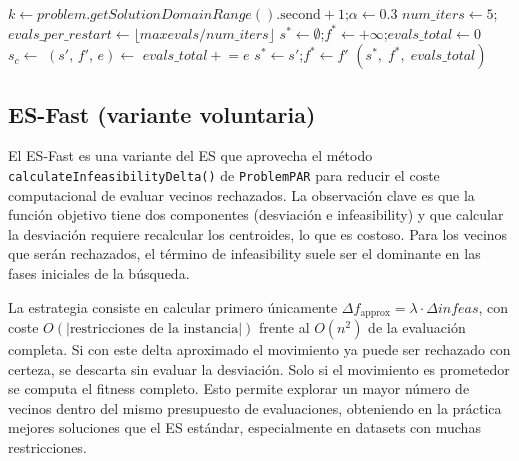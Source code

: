 \documentclass[a4paper,12pt]{article}%
\begin{document}
\begin{algorithm}[H]
	\begin{algorithmic}
		\State $k \leftarrow \textit{problem.getSolutionDomainRange}().\text{second}+1$;\quad $\alpha \leftarrow 0.3$
		\State $\textit{num\_iters} \leftarrow 5$;\quad $\textit{evals\_per\_restart} \leftarrow \lfloor\textit{maxevals}/\textit{num\_iters}\rfloor$
		\State $s^* \leftarrow \emptyset$;\quad $f^* \leftarrow +\infty$;\quad $\textit{evals\_total} \leftarrow 0$
		\State $s_c \leftarrow$ 
		\State $(s',\, f',\, e) \leftarrow$ 
		\State $\textit{evals\_total} \mathrel{+}= e$
		\quad $s^* \leftarrow s'$;\quad $f^* \leftarrow f'$ \EndIf
		\EndFor
		\State \Return $(s^*,\; f^*,\; \textit{evals\_total})$
		\EndFunction
	\end{algorithmic}
\end{algorithm}


\subsection{ES-Fast (variante voluntaria)}

\noindent El ES-Fast es una variante del ES que aprovecha el método \texttt{calculateInfeasibilityDelta()} de \texttt{ProblemPAR} para reducir el coste computacional de evaluar vecinos rechazados. La observación clave es que la función objetivo tiene dos componentes (desviación e infeasibility) y que calcular la desviación requiere recalcular los centroides, lo que es costoso. Para los vecinos que serán rechazados, el término de infeasibility suele ser el dominante en las fases iniciales de la búsqueda.

La estrategia consiste en calcular primero únicamente $\Delta f_{\text{approx}} = \lambda \cdot \Delta\textit{infeas}$, con coste $O(|\text{restricciones de la instancia}|)$ frente al $O(n^2)$ de la evaluación completa. Si con este delta aproximado el movimiento ya puede ser rechazado con certeza, se descarta sin evaluar la desviación. Solo si el movimiento es prometedor se computa el fitness completo. Esto permite explorar un mayor número de vecinos dentro del mismo presupuesto de evaluaciones, obteniendo en la práctica mejores soluciones que el ES estándar, especialmente en datasets con muchas restricciones.
\end{document}
